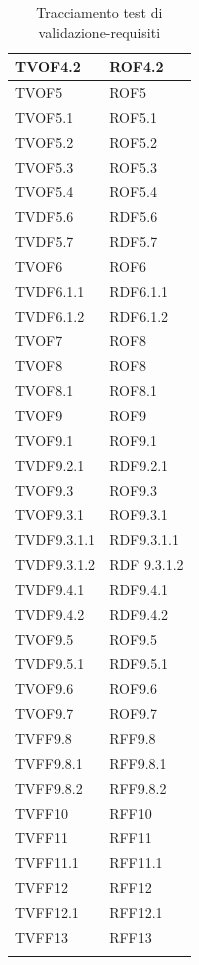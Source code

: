 \documentclass[openany,12pt,a4paper]{report}
\begin{document}
\begin{longtable}{| p{4cm} |p{4cm}|}
	\hline
	TVOF4.2&ROF4.2
	\\[1em]
	\hline
	 TVOF5&ROF5
	\\[1em]
	\hline
	 TVOF5.1&ROF5.1
	\\[1em]	
	\hline
	 TVOF5.2&ROF5.2
	\\[1em]	
	\hline
	 TVOF5.3&ROF5.3
	\\[1em]	
	\hline
	 TVOF5.4&ROF5.4
	\\[1em]	
	\hline
	 TVDF5.6&RDF5.6
	\\[1em]
	\hline
	 TVDF5.7&RDF5.7
	\\[1em]
	\hline
	\newline TVOF6&ROF6
	\\[1em]
	\hline
	 TVDF6.1.1&RDF6.1.1
	\\[1em]
	\hline	
	 TVDF6.1.2&RDF6.1.2
	\\[1em]
	\hline	
    TVOF7&ROF8
	\\[1em]	
	\hline
	 TVOF8&ROF8
	\\[1em]
	\hline
	 TVOF8.1&ROF8.1
	\\[1em]
	\hline
 	TVOF9&ROF9
	\\[1em]
	\hline
	 TVOF9.1& ROF9.1
	\\[1em]
	\hline
	 TVDF9.2.1& RDF9.2.1
	\\[1em]
	\hline
	 TVOF9.3&ROF9.3
	\\[1em]
	\hline
	 TVOF9.3.1& ROF9.3.1
	\\[1em]
	\hline
	 TVDF9.3.1.1& RDF9.3.1.1
	\\[1em]
	\hline
	 TVDF9.3.1.2& RDF 9.3.1.2
	\\[1em]
	\hline
	 TVDF9.4.1&RDF9.4.1
	\\[1em]
	\hline
	 TVDF9.4.2& RDF9.4.2
	\\[1em]
	\hline
	 TVOF9.5& ROF9.5
	\\[1em]
	\hline
	 TVDF9.5.1&RDF9.5.1
	\\[1em]
	\hline
	 TVOF9.6&ROF9.6
	\\[1em]
	\hline
	 TVOF9.7&ROF9.7
	\\[1em]
	\hline
	 TVFF9.8&RFF9.8
	\\[1em]
	\hline
	 TVFF9.8.1&RFF9.8.1
	\\[1em]
	\hline
	TVFF9.8.2&RFF9.8.2
	\\[1em]
	\hline
	 TVFF10&RFF10
	\\[1em]
	\hline
	 TVFF11&RFF11
	\\[1em]
	\hline	
	
	TVFF11.1&RFF11.1
	\\[1em]
	\hline
	
    TVFF12&RFF12
	\\[1em]
	\hline
	
    TVFF12.1&RFF12.1
	\\[1em]
	\hline
	 TVFF13&RFF13
	\\[1em]
	\hline
\caption{Tracciamento test di validazione-requisiti}
\end{longtable}
\end{document}
